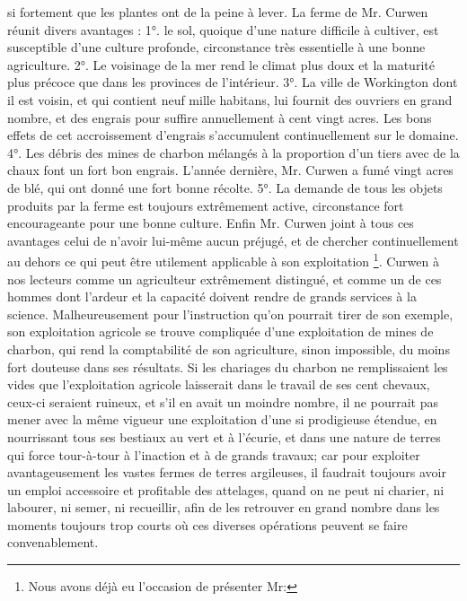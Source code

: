 si fortement que les plantes ont de la peine à lever.
La ferme de Mr. Curwen réunit divers avantages : 1°. le sol, quoique d'une nature difficile à cultiver, est susceptible d'une culture profonde, circonstance très essentielle à une bonne agriculture. 2°. Le voisinage de la mer rend le climat plus doux et la maturité plus précoce que dans les provinces de l'intérieur. 3°. La ville de Workington dont il est voisin, et qui contient neuf mille habitans, lui fournit des ouvriers en grand nombre, et des engrais pour suffire annuellement à cent vingt acres. Les bons effets de cet accroissement d'engrais s'accumulent continuellement sur le domaine. 4°. Les débris des mines de charbon mélangés à la proportion d'un tiers avec de la chaux font un fort bon engrais. L'année dernière, Mr. Curwen a fumé vingt acres de blé, qui ont donné une fort bonne récolte. 5°. La demande de tous les objets produits par la ferme est toujours extrêmement active, circonstance fort encourageante pour une bonne culture. Enfin Mr. Curwen joint à tous ces avantages celui de n'avoir lui-même aucun préjugé, et de chercher continuellement au dehors ce qui peut être utilement applicable à son exploitation \footnote{Nous avons déjà eu l'occasion de présenter Mr:}.\setcounter{page}{222} Curwen à nos lecteurs comme un agriculteur extrêmement distingué, et comme un de ces hommes dont l'ardeur et la capacité doivent rendre de grands services à la science. Malheureusement pour l'instruction qu'on pourrait tirer de son exemple, son exploitation agricole se trouve compliquée d'une exploitation de mines de charbon, qui rend la comptabilité de son agriculture, sinon impossible, du moins fort douteuse dans ses résultats. Si les chariages du charbon ne remplissaient les vides que l'exploitation agricole laisserait dans le travail de ses cent chevaux, ceux-ci seraient ruineux, et s'il en avait un moindre nombre, il ne pourrait pas mener avec la même vigueur une exploitation d'une si prodigieuse étendue, en nourrissant tous ses bestiaux au vert et à l'écurie, et dans une nature de terres qui force tour-à-tour à l'inaction et à de grands travaux; car pour exploiter avantageusement les vastes fermes de terres argileuses, il faudrait toujours avoir un emploi accessoire et profitable des attelages, quand on ne peut ni charier, ni labourer, ni semer, ni recueillir, afin de les retrouver en grand nombre dans les moments toujours trop courts où ces diverses opérations peuvent se faire convenablement.
